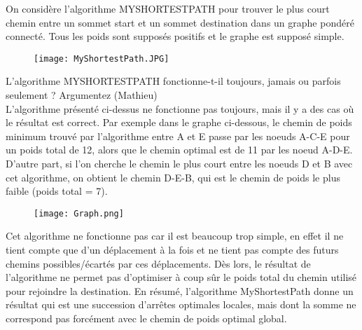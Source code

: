 On considère l’algorithme MYSHORTESTPATH pour trouver le plus court chemin
entre un sommet start et un sommet destination dans un graphe pondéré
connecté. Tous les poids sont supposés positifs et le graphe est supposé simple. \\


\begin{figure}[hp]
	\centering
		\vspace{-0.4cm}
		\texttt{[image: MyShortestPath.JPG]}
	\label{fig:MyShortestPath}
\end{figure}

L’algorithme MYSHORTESTPATH fonctionne-t-il toujours, jamais ou parfois seulement ? Argumentez 
(Mathieu) \\

L'algorithme présenté ci-dessus ne fonctionne pas toujours, mais il y a des cas où le résultat est correct. Par exemple dans le graphe ci-dessous, le chemin de poids minimum trouvé par l'algorithme entre A et E passe par les noeuds A-C-E pour un poids total de 12, alors que le chemin optimal est de 11 par les noeud A-D-E. D'autre part, si l'on cherche le chemin le plus court entre les noeuds D et B avec cet algorithme, on obtient le chemin D-E-B, qui est le chemin de poids le plus faible (poids total = 7).

\begin{figure}[hp]
	\centering
		\texttt{[image: Graph.png]}
	\label{fig:Graph}
\end{figure}

Cet algorithme ne fonctionne pas car il est beaucoup trop simple, en effet il ne tient compte que d'un déplacement à la fois et ne tient pas compte des futurs chemins possibles/écartés par ces déplacements. Dès lors, le résultat de l'algorithme ne permet pas d'optimiser à coup sûr le poids total du chemin utilisé pour rejoindre la destination. En résumé, l'algorithme MyShortestPath donne un résultat qui est une succession d'arrêtes optimales locales, mais dont la somme ne correspond pas forcément avec le chemin de poids optimal global.